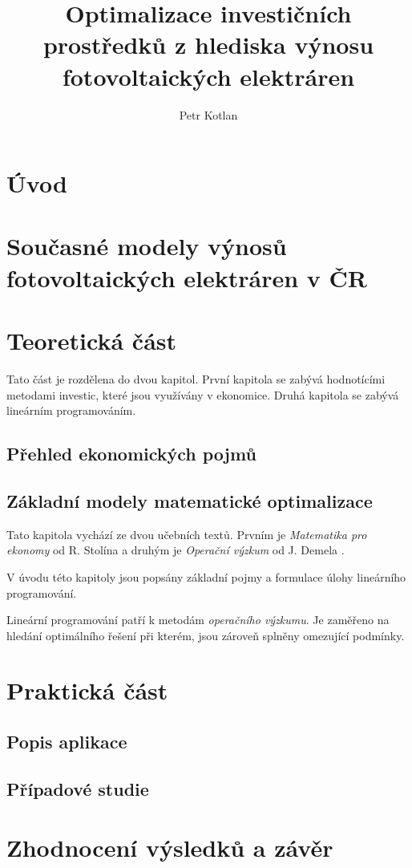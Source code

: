 \documentclass[a4paper, 12pt]{report}
\author{Petr Kotlan}
\title{Optimalizace investičních prostředků z hlediska
výnosu fotovoltaických elektráren}
\date{}
\begin{document}



\tableofcontents

\chapter*{Úvod}

\chapter{Současné modely výnosů \\ fotovoltaických elektráren v ČR}

\chapter{Teoretická část}

Tato část je rozdělena do dvou kapitol. První kapitola se zabývá hodnotícími metodami investic, které jsou využívány v ekonomice.
Druhá kapitola se zabývá lineárním programováním.

\section{Přehled ekonomických pojmů}


\section{Základní modely matematické optimalizace}
Tato kapitola vychází ze dvou učebních textů. Prvním je \textit{Matematika pro ekonomy} od R. Stolína \cite{matematika_pro_ekonomy} a druhým je \textit{Operační výzkum} od J. Demela \cite{demel}.


V úvodu této kapitoly jsou popsány základní pojmy a formulace úlohy lineárního programování.

Lineární programování patří k metodám \textit{operačního výzkumu}.
Je zaměřeno na hledání optimálního řešení při kterém, jsou zároveň splněny omezující podmínky.




\chapter{Praktická část}

\section{Popis aplikace}



\section{Případové studie}

\chapter{Zhodnocení výsledků a závěr}



\end{document}

